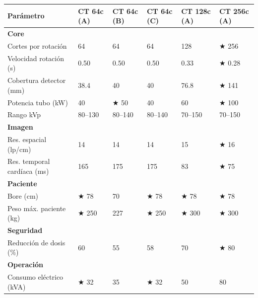 \documentclass[11pt, a4paper]{article}
\begin{document}
\begin{center}
\renewcommand{\arraystretch}{1.25}
\begin{tabular}{P{4.2cm} C{2cm} C{2cm} C{2cm} C{2cm} C{2cm}}
\toprule
{}
\textbf{\color{white}Parámetro} &
\textbf{\color{white}CT 64c (A)} &
\textbf{\color{white}CT 64c (B)} &
\textbf{\color{white}CT 64c (C)} &
\textbf{\color{white}CT 128c (A)} &
\textbf{\color{white}CT 256c (A)} \\
\midrule
{}\small\textbf{Core} & & & & & \\
Cortes por rotación        & 64 & 64 & 64 & 128 & $\bigstar$ 256 \\
Velocidad rotación (s)     & 0.50 & 0.50 & 0.50 & 0.33 & $\bigstar$ 0.28 \\
Cobertura detector (mm)    & 38.4 & 40 & 40 & 76.8 & $\bigstar$ 141 \\
Potencia tubo (kW)         & 40 & $\bigstar$ 50 & 40 & 60 & $\bigstar$ 100 \\
Rango kVp                  & 80--130 & 80--140 & 80--140 & 70--150 & 70--150 \\
\small\textbf{Imagen} & & & & & \\
Res. espacial (lp/cm)      & 14 & 14 & 14 & 15 & $\bigstar$ 16 \\
Res. temporal cardíaca (ms)& 165 & 175 & 175 & 83 & $\bigstar$ 75 \\
\small\textbf{Paciente} & & & & & \\
Bore (cm)                  & $\bigstar$ 78 & 70 & $\bigstar$ 78 & $\bigstar$ 78 & $\bigstar$ 78 \\
Peso máx. paciente (kg)    & $\bigstar$ 250 & 227 & $\bigstar$ 250 & $\bigstar$ 300 & $\bigstar$ 300 \\
\small\textbf{Seguridad} & & & & & \\
Reducción de dosis (\%)    & 60 & 55 & 58 & 70 & $\bigstar$ 80 \\
\small\textbf{Operación} & & & & & \\
Consumo eléctrico (kVA)    & $\bigstar$ 32 & 35 & $\bigstar$ 32 & 50 & 80 \\

\end{tabular}
\end{center}
\end{document}
